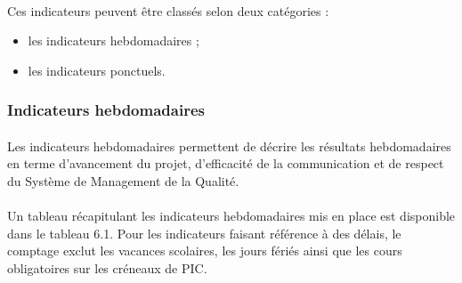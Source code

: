\paragraph*{} Ces indicateurs peuvent être classés selon deux catégories :
\begin{itemize} 
	\item les indicateurs hebdomadaires ;
	\item les indicateurs ponctuels.
 \end{itemize}

\subsubsection*{Indicateurs hebdomadaires}
\label{Indicateurs hebdomadaires}
\paragraph*{} Les indicateurs hebdomadaires permettent de décrire les résultats hebdomadaires en terme
d'avancement du projet, d'efficacité de la communication et de respect du Système de Management de la Qualité.

\paragraph*{} Un tableau récapitulant les indicateurs hebdomadaires mis en place est disponible dans le
tableau 6.1. Pour les indicateurs faisant référence à des délais, le comptage exclut les vacances
scolaires, les jours fériés ainsi que les cours obligatoires sur les créneaux de PIC.


